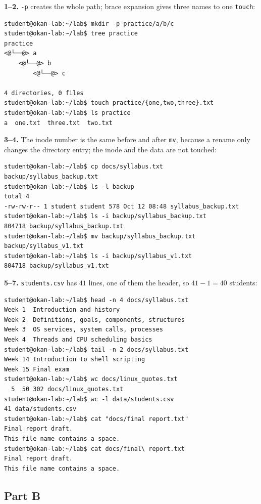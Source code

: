 \documentclass[11pt,a4paper]{article}
\newcommand{\cmd}[1]{\texttt{#1}}
\begin{document}
\textbf{1--2.} \cmd{-p} creates the whole path; brace expansion gives three names to one \cmd{touch}:
\begin{lstlisting}[style=term,basicstyle=\ttfamily\scriptsize\color{light}]
student@okan-lab:~/lab$ mkdir -p practice/a/b/c
student@okan-lab:~/lab$ tree practice
practice
<@└──@> a
    <@└──@> b
        <@└──@> c

4 directories, 0 files
student@okan-lab:~/lab$ touch practice/{one,two,three}.txt
student@okan-lab:~/lab$ ls practice
a  one.txt  three.txt  two.txt
\end{lstlisting}

\textbf{3--4.} The inode number is the same before and after \cmd{mv}, because a rename only changes the directory entry; the inode and the data are not touched:
\begin{lstlisting}[style=term,basicstyle=\ttfamily\scriptsize\color{light}]
student@okan-lab:~/lab$ cp docs/syllabus.txt backup/syllabus_backup.txt
student@okan-lab:~/lab$ ls -l backup
total 4
-rw-rw-r-- 1 student student 578 Oct 12 08:48 syllabus_backup.txt
student@okan-lab:~/lab$ ls -i backup/syllabus_backup.txt
804718 backup/syllabus_backup.txt
student@okan-lab:~/lab$ mv backup/syllabus_backup.txt backup/syllabus_v1.txt
student@okan-lab:~/lab$ ls -i backup/syllabus_v1.txt
804718 backup/syllabus_v1.txt
\end{lstlisting}

\textbf{5--7.} \texttt{students.csv} has $41$ lines, one of them the header, so $41 - 1 = 40$ students:
\begin{lstlisting}[style=term,basicstyle=\ttfamily\scriptsize\color{light}]
student@okan-lab:~/lab$ head -n 4 docs/syllabus.txt
Week 1  Introduction and history
Week 2  Definitions, goals, components, structures
Week 3  OS services, system calls, processes
Week 4  Threads and CPU scheduling basics
student@okan-lab:~/lab$ tail -n 2 docs/syllabus.txt
Week 14 Introduction to shell scripting
Week 15 Final exam
student@okan-lab:~/lab$ wc docs/linux_quotes.txt
  5  50 302 docs/linux_quotes.txt
student@okan-lab:~/lab$ wc -l data/students.csv
41 data/students.csv
student@okan-lab:~/lab$ cat "docs/final report.txt"
Final report draft.
This file name contains a space.
student@okan-lab:~/lab$ cat docs/final\ report.txt
Final report draft.
This file name contains a space.
\end{lstlisting}

\subsection*{Part B}
\end{document}
